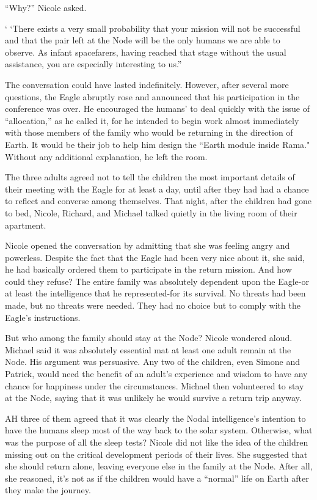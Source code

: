 \documentclass[]{article}
\begin{document}
{“Why?” Nicole asked.

‘ ‘There exists a very small probability that your mission will not be successful and that the pair left at the Node will be the only humans we are able to observe.  As infant spacefarers, having reached that stage without the usual assistance, you are especially interesting to us.”

The conversation could have lasted indefinitely.  However, after several more questions, the Eagle abruptly rose and announced that his participation in the conference was over.  He encouraged the humans’ to deal quickly with the issue of “allocation,” as he called it, for he intended to begin work almost immediately with those members of the family who would be returning in the direction of Earth.  It would be their job to help him design the “Earth module inside Rama."  Without any additional explanation, he left the room.

The three adults agreed not to tell the children the most important details of their meeting with the Eagle for at least a day, until after they had had a chance to reflect and converse among themselves.  That night, after the children had gone to bed, Nicole, Richard, and Michael talked quietly in the living room of their apartment.

Nicole opened the conversation by admitting that she was feeling angry and powerless.  Despite the fact that the Eagle had been very nice about it, she said, he had basically ordered them to participate in the return mission.  And how could they refuse? The entire family was absolutely dependent upon the Eagle-or at least the intelligence that he represented-for its survival.  No threats had been made, but no threats were needed.  They had no choice but to comply with the Eagle’s instructions.

But who among the family should stay at the Node? Nicole wondered aloud.  Michael said it was absolutely essential mat at least one adult remain at the Node.  His argument was persuasive.  Any two of the children, even Simone and Patrick, would need the benefit of an adult’s experience and wisdom to have any chance for happiness under the circumstances.  Michael then volunteered to stay at the Node, saying that it was unlikely he would survive a return trip anyway.

AH three of them agreed that it was clearly the Nodal intelligence’s intention to have the humans sleep most of the way back to the solar system.  Otherwise, what was the purpose of all the sleep tests? Nicole did not like the idea of the children missing out on the critical development periods of their lives.  She suggested that she should return alone, leaving everyone else in the family at the Node.  After all, she reasoned, it’s not as if the children would have a “normal” life on Earth after they make the journey.

}
\end{document}
